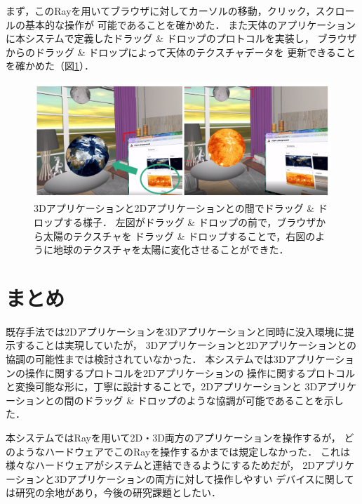 まず，このRayを用いてブラウザに対してカーソルの移動，クリック，スクロールの基本的な操作が
可能であることを確かめた．
また天体のアプリケーションに本システムで定義したドラッグ \& ドロップのプロトコルを実装し，
ブラウザからのドラッグ \& ドロップによって天体のテクスチャデータを
更新できることを確かめた（図\ref{fig:dnd}）．

\begin{figure}[htbp]
  \centering
  \includegraphics[keepaspectratio, width=\linewidth]{figures/dnd.png}
  \caption{
    3Dアプリケーションと2Dアプリケーションとの間でドラッグ \& ドロップする様子．
    左図がドラッグ \& ドロップの前で，ブラウザから太陽のテクスチャを
    ドラッグ \& ドロップすることで，右図のように地球のテクスチャを太陽に変化させることができた．
  }
  \label{fig:dnd}
\end{figure}


\section{まとめ}

既存手法では2Dアプリケーションを3Dアプリケーションと同時に没入環境に提示することは実現していたが，
3Dアプリケーションと2Dアプリケーションとの協調の可能性までは検討されていなかった．
本システムでは3Dアプリケーションの操作に関するプロトコルを2Dアプリケーションの
操作に関するプロトコルと変換可能な形に，丁寧に設計することで，2Dアプリケーションと
3Dアプリケーションとの間のドラッグ \& ドロップのような協調が可能であることを示した．

本システムではRayを用いて2D・3D両方のアプリケーションを操作するが，
どのようなハードウェアでこのRayを操作するかまでは規定しなかった．
これは様々なハードウェアがシステムと連結できるようにするためだが，
2Dアプリケーションと3Dアプリケーションの両方に対して操作しやすい
デバイスに関しては研究の余地があり，今後の研究課題としたい．
